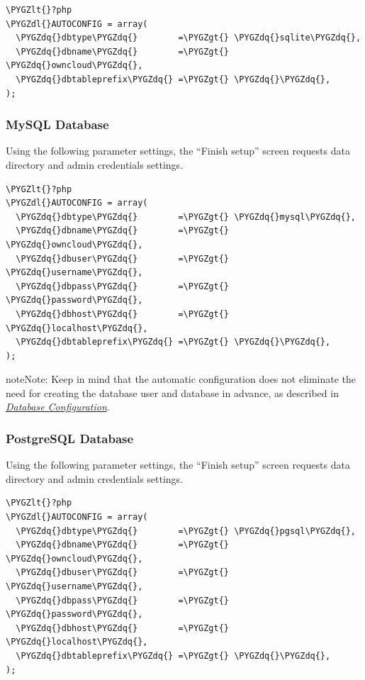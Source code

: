 \documentclass[letterpaper,10pt,english]{sphinxmanual}
\def\PYGZlt{\char`\<}
\def\PYGZgt{\char`\>}
\def\PYGZdl{\char`\$}
\def\PYGZdq{\char`\"}
\begin{document}
\begin{Verbatim}[commandchars=\\\{\}]
\PYGZlt{}?php
\PYGZdl{}AUTOCONFIG = array(
  \PYGZdq{}dbtype\PYGZdq{}        =\PYGZgt{} \PYGZdq{}sqlite\PYGZdq{},
  \PYGZdq{}dbname\PYGZdq{}        =\PYGZgt{} \PYGZdq{}owncloud\PYGZdq{},
  \PYGZdq{}dbtableprefix\PYGZdq{} =\PYGZgt{} \PYGZdq{}\PYGZdq{},
);
\end{Verbatim}


\subsubsection{MySQL Database}
\label{configuration_server/automatic_configuration:mysql-database}
Using the following parameter settings, the ``Finish setup'' screen requests data directory and admin credentials settings.

\begin{Verbatim}[commandchars=\\\{\}]
\PYGZlt{}?php
\PYGZdl{}AUTOCONFIG = array(
  \PYGZdq{}dbtype\PYGZdq{}        =\PYGZgt{} \PYGZdq{}mysql\PYGZdq{},
  \PYGZdq{}dbname\PYGZdq{}        =\PYGZgt{} \PYGZdq{}owncloud\PYGZdq{},
  \PYGZdq{}dbuser\PYGZdq{}        =\PYGZgt{} \PYGZdq{}username\PYGZdq{},
  \PYGZdq{}dbpass\PYGZdq{}        =\PYGZgt{} \PYGZdq{}password\PYGZdq{},
  \PYGZdq{}dbhost\PYGZdq{}        =\PYGZgt{} \PYGZdq{}localhost\PYGZdq{},
  \PYGZdq{}dbtableprefix\PYGZdq{} =\PYGZgt{} \PYGZdq{}\PYGZdq{},
);
\end{Verbatim}

\begin{notice}{note}{Note:}
Keep in mind that the automatic configuration does not eliminate the need for
creating the  database user and database in advance, as described in
{\hyperref[configuration_database/linux_database_configuration::doc]{\emph{Database Configuration}}}.
\end{notice}


\subsubsection{PostgreSQL Database}
\label{configuration_server/automatic_configuration:postgresql-database}
Using the following parameter settings, the ``Finish setup'' screen requests data directory and admin credentials settings.

\begin{Verbatim}[commandchars=\\\{\}]
\PYGZlt{}?php
\PYGZdl{}AUTOCONFIG = array(
  \PYGZdq{}dbtype\PYGZdq{}        =\PYGZgt{} \PYGZdq{}pgsql\PYGZdq{},
  \PYGZdq{}dbname\PYGZdq{}        =\PYGZgt{} \PYGZdq{}owncloud\PYGZdq{},
  \PYGZdq{}dbuser\PYGZdq{}        =\PYGZgt{} \PYGZdq{}username\PYGZdq{},
  \PYGZdq{}dbpass\PYGZdq{}        =\PYGZgt{} \PYGZdq{}password\PYGZdq{},
  \PYGZdq{}dbhost\PYGZdq{}        =\PYGZgt{} \PYGZdq{}localhost\PYGZdq{},
  \PYGZdq{}dbtableprefix\PYGZdq{} =\PYGZgt{} \PYGZdq{}\PYGZdq{},
);
\end{Verbatim}
\end{document}
